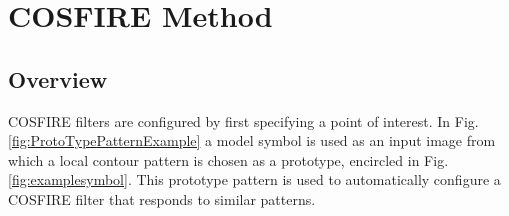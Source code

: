 \section {COSFIRE Method}
\label{sec:cosfiremethod}

\subsection{Overview}
COSFIRE filters are configured by first specifying a point of interest. In Fig.\ref{fig:ProtoTypePatternExample} a model symbol is used as an input image from which a local contour pattern is chosen as a prototype, encircled in Fig. \ref{fig:examplesymbol}. This prototype pattern is used to automatically configure a COSFIRE filter that responds to similar patterns.\\

